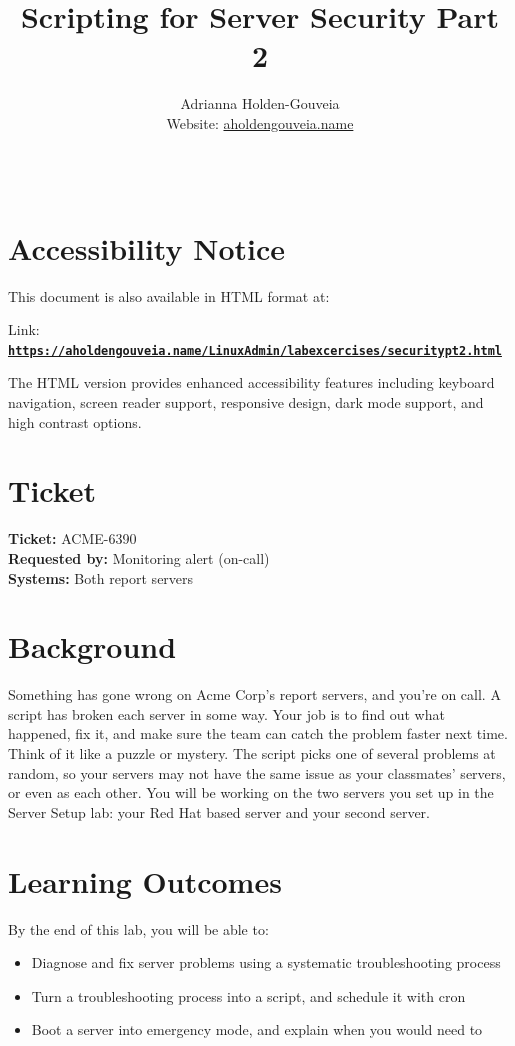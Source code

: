 \documentclass[12pt]{article}
\title{Scripting for Server Security Part 2}
\author{
        Adrianna Holden-Gouveia \\
        Website: \href{https://aholdengouveia.name}{aholdengouveia.name}\\ 
        \date{\vspace{-5ex}}
        \faGithub {: aholdengouveia} \\
        }
\begin{document}
    

\maketitle



\section*{Accessibility Notice}
This document is also available in HTML format at:

Link: \href{https://aholdengouveia.name/LinuxAdmin/labexcercises/securitypt2.html}{\textbf{\nolinkurl{https://aholdengouveia.name/LinuxAdmin/labexcercises/securitypt2.html}}}

The HTML version provides enhanced accessibility features including keyboard navigation, screen reader support, responsive design, dark mode support, and high contrast options.


\section*{Ticket}
\noindent\textbf{Ticket:} ACME-6390\\
\textbf{Requested by:} Monitoring alert (on-call)\\
\textbf{Systems:} Both report servers

\section*{Background}
Something has gone wrong on Acme Corp's report servers, and you're on call. A script has broken each server in some way. Your job is to find out what happened, fix it, and make sure the team can catch the problem faster next time. Think of it like a puzzle or mystery. The script picks one of several problems at random, so your servers may not have the same issue as your classmates' servers, or even as each other. You will be working on the two servers you set up in the Server Setup lab: your Red Hat based server and your second server.

\section*{Learning Outcomes}
By the end of this lab, you will be able to:
\begin{itemize}
    \item Diagnose and fix server problems using a systematic troubleshooting process
    \item Turn a troubleshooting process into a script, and schedule it with cron
    \item Boot a server into emergency mode, and explain when you would need to
\end{itemize}
\end{document}
